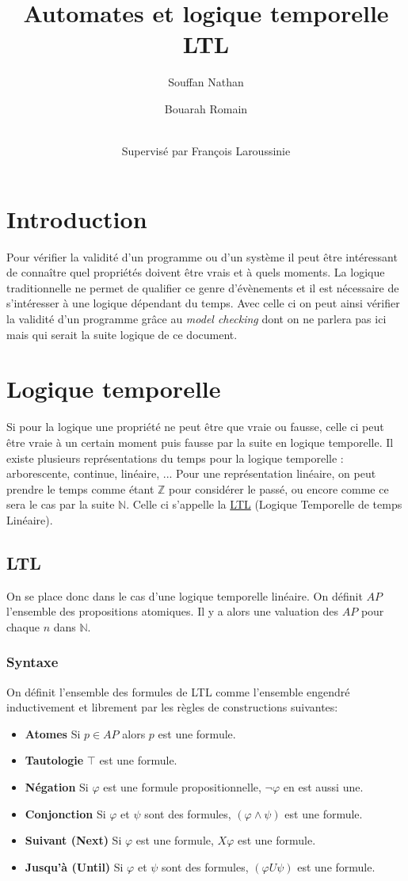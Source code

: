 \documentclass[12pt,a4paper]{article}
\title {Automates et logique temporelle LTL}
\author{
  Souffan Nathan \and
  Bouarah Romain \and
  \\Supervisé par François Laroussinie
}
\theoremstyle{plain}
\theoremstyle{definition}
\begin{document}
\maketitle
\newpage

\section{Introduction}
Pour vérifier la validité d'un programme ou d'un système il peut être intéressant de connaître quel propriétés doivent être vrais et à quels moments. La logique traditionnelle ne permet de qualifier ce genre d'évènements et il est nécessaire de s'intéresser à une logique dépendant du temps. Avec celle ci on peut ainsi vérifier la validité d'un programme grâce au \emph{model checking} dont on ne parlera pas ici mais qui serait la suite logique de ce document.

\section{Logique temporelle}

Si pour la logique une propriété ne peut être que vraie ou fausse, celle ci peut être vraie à un certain moment puis fausse par la suite en logique temporelle.
Il existe plusieurs représentations du temps pour la logique temporelle : arborescente, continue, linéaire, ...
Pour une représentation linéaire, on peut prendre le temps comme étant $\mathbb{Z}$ pour considérer le passé, ou encore comme ce sera le cas par la suite $\mathbb{N}$.
Celle ci s'appelle la \underline{LTL} (Logique Temporelle de temps Linéaire).

\subsection{LTL}
On se place donc dans le cas d'une logique temporelle linéaire.
On définit $AP$ l'ensemble des propositions atomiques. Il y a alors une valuation des $AP$ pour chaque $n$ dans $\mathbb{N}$.

\subsubsection{Syntaxe}
On définit l'ensemble des formules de LTL comme l'ensemble engendré inductivement et librement par les règles de constructions suivantes:
\begin{itemize}
	\item[] \textbf{Atomes} Si $p \in AP$ alors $p$ est une formule.
	\item[] \textbf{Tautologie} $\top$ est une formule.
	\item[] \textbf{Négation} Si $\varphi$ est une formule propositionnelle, $\lnot \varphi$ en est aussi une.
	\item[] \textbf{Conjonction} Si $\varphi$ et $\psi$ sont des formules, $(\varphi\land \psi)$ est une formule.
	\item[] \textbf{Suivant (Next)} Si $\varphi$ est une formule, $X\varphi$ est une formule.
	\item[] \textbf{Jusqu'à (Until)} Si $\varphi$ et $\psi$ sont des formules, $(\varphi U \psi)$ est une formule.
\end{itemize}
\end{document}
